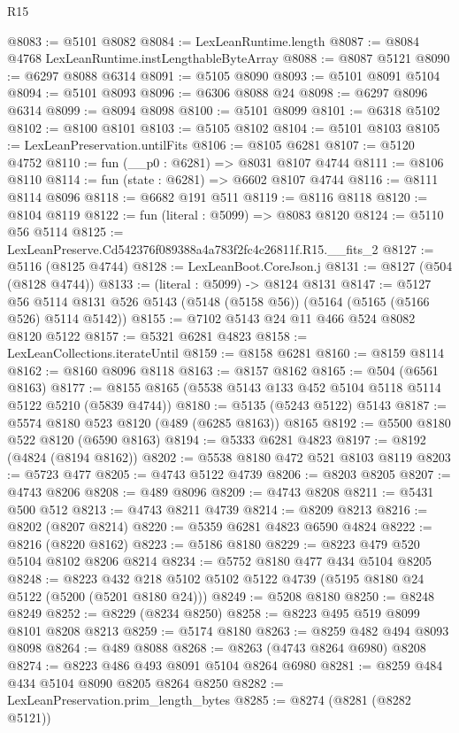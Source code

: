 \begin{lexlean}{R15}
\begin{coremodule}
{{{{{{{{{{{@8083 := @5101 @8082
@8084 := LexLeanRuntime.length
@8087 := @8084 @4768 LexLeanRuntime.instLengthableByteArray
@8088 := @8087 @5121
@8090 := @6297 @8088 @6314
@8091 := @5105 @8090
@8093 := @5101 @8091 @5104
@8094 := @5101 @8093
@8096 := @6306 @8088 @24
@8098 := @6297 @8096 @6314
@8099 := @8094 @8098
@8100 := @5101 @8099
@8101 := @6318 @5102
@8102 := @8100 @8101
@8103 := @5105 @8102
@8104 := @5101 @8103
@8105 := LexLeanPreservation.untilFits
@8106 := @8105 @6281
@8107 := @5120 @4752
@8110 := fun (__p0 : @6281) => @8031 @8107 @4744
@8111 := @8106 @8110
@8114 := fun (state : @6281) => @6602 @8107 @4744
@8116 := @8111 @8114 @8096
@8118 := @6682 @191 @511
@8119 := @8116 @8118
@8120 := @8104 @8119
@8122 := fun (literal : @5099) => @8083 @8120
@8124 := @5110 @56 @5114
@8125 := LexLeanPreserve.Cd542376f089388a4a783f2fc4c26811f.R15.__fits_2
@8127 := @5116 (@8125 @4744)
@8128 := LexLeanBoot.CoreJson.j
@8131 := @8127 (@504 (@8128 @4744))
@8133 := (literal : @5099) -> @8124 @8131
@8147 := @5127
    @56
    @5114
    @8131
    @526
    @5143
    (@5148 (@5158 @56))
    (@5164 (@5165 (@5166 @526) @5114 @5142))
@8155 := @7102 @5143 @24 @11 @466 @524 @8082 @8120 @5122
@8157 := @5321 @6281 @4823
@8158 := LexLeanCollections.iterateUntil
@8159 := @8158 @6281
@8160 := @8159 @8114
@8162 := @8160 @8096 @8118
@8163 := @8157 @8162
@8165 := @504 (@6561 @8163)
@8177 := @8155 @8165 (@5538 @5143 @133 @452 @5104 @5118 @5114 @5122 @5210 (@5839 @4744))
@8180 := @5135 (@5243 @5122) @5143
@8187 := @5574 @8180 @523 @8120 (@489 (@6285 @8163)) @8165
@8192 := @5500 @8180 @522 @8120 (@6590 @8163)
@8194 := @5333 @6281 @4823
@8197 := @8192 (@4824 (@8194 @8162))
@8202 := @5538 @8180 @472 @521 @8103 @8119
@8203 := @5723 @477
@8205 := @4743 @5122 @4739
@8206 := @8203 @8205
@8207 := @4743 @8206
@8208 := @489 @8096
@8209 := @4743 @8208
@8211 := @5431 @500 @512
@8213 := @4743 @8211 @4739
@8214 := @8209 @8213
@8216 := @8202 (@8207 @8214)
@8220 := @5359 @6281 @4823 @6590 @4824
@8222 := @8216 (@8220 @8162)
@8223 := @5186 @8180
@8229 := @8223 @479 @520 @5104 @8102 @8206 @8214
@8234 := @5752 @8180 @477 @434 @5104 @8205
@8248 := @8223 @432 @218 @5102 @5102 @5122 @4739 (@5195 @8180 @24 @5122 (@5200 (@5201 @8180 @24)))
@8249 := @5208 @8180
@8250 := @8248 @8249
@8252 := @8229 (@8234 @8250)
@8258 := @8223 @495 @519 @8099 @8101 @8208 @8213
@8259 := @5174 @8180
@8263 := @8259 @482 @494 @8093 @8098
@8264 := @489 @8088
@8268 := @8263 (@4743 @8264 @6980) @8208
@8274 := @8223 @486 @493 @8091 @5104 @8264 @6980
@8281 := @8259 @484 @434 @5104 @8090 @8205 @8264 @8250
@8282 := LexLeanPreservation.prim_length_bytes
@8285 := @8274 (@8281 (@8282 @5121))
}}}}}}}}}}}
\end{coremodule}
\end{lexlean}
